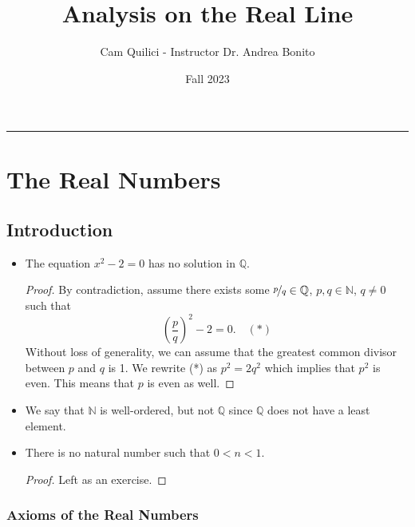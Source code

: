\documentclass{article}
\title{Analysis on the Real Line}
\author{Cam Quilici - Instructor Dr. Andrea Bonito}
\date{Fall 2023}
\newcommand{\Q}{\mathbb{Q}}
\newcommand{\N}{\mathbb{N}}
\newcommand{\?}{\stackrel{?}{=}}
\theoremstyle{definition} %
\begin{document}
\maketitle

\vspace{-0.3in}
\noindent
\rule{\linewidth}{0.4pt}

\tableofcontents

\newpage

\section{The Real Numbers}

\subsection{Introduction}

\begin{itemize}
    \item[]
          \begin{lemma}
              The equation $x^2 - 2 = 0$ has no solution in $\Q$.
          \end{lemma}
          \begin{proof}
              By contradiction, assume there exists some $\nicefrac{p}{q} \in \Q$, $p, q \in \N$, $q \neq 0$ such that
              $$\left(\frac{p}{q}\right)^2 - 2 = 0. \quad (*)$$
              Without loss of generality, we can assume that the greatest common divisor between $p$ and $q$ is 1. We rewrite (*) as $p^2 = 2q^2$ which implies that $p^2$ is even. This means that $p$ is even as well.
          \end{proof}
    \item We say that $\N$ is well-ordered, but not $\Q$ since $\Q$ does not have a least element.
    \item[]
          \begin{proposition}
              There is no natural number such that $0 < n < 1$.
          \end{proposition}
          \begin{proof}
              Left as an exercise.
          \end{proof}
\end{itemize}

\subsubsection{Axioms of the Real Numbers}
\end{document}
